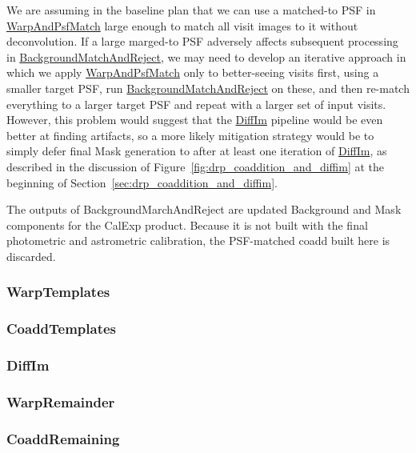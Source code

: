 We are assuming in the baseline plan that we can use a matched-to PSF in \hyperref[sec:drpWarpAndPsfMatch]{WarpAndPsfMatch} large enough to match all visit images to it without deconvolution.  If a large marged-to PSF adversely affects subsequent processing in \hyperref[sec:drpBackgroundMatchAndReject]{BackgroundMatchAndReject}, we may need to develop an iterative approach in which we apply \hyperref[sec:drpWarpAndPsfMatch]{WarpAndPsfMatch} only to better-seeing visits first, using a smaller target PSF, run \hyperref[sec:drpBackgroundMatchAndReject]{BackgroundMatchAndReject} on these, and then re-match everything to a larger target PSF and repeat with a larger set of input visits.  However, this problem would suggest that the \hyperref[sec:DiffIm]{DiffIm} pipeline would be even better at finding artifacts, so a more likely mitigation strategy would be to simply defer final Mask generation to after at least one iteration of \hyperref[sec:DiffIm]{DiffIm}, as described in the discussion of Figure~\ref{fig:drp_coaddition_and_diffim} at the beginning of Section~\ref{sec:drp_coaddition_and_diffim}.

The outputs of BackgroundMarchAndReject are updated Background and Mask components for the CalExp product.  Because it is not built with the final photometric and astrometric calibration, the PSF-matched coadd built here is discarded.

\subsubsection{WarpTemplates}
\label{sec:drpWarpTemplates}

\subsubsection{CoaddTemplates}
\label{sec:drpCoaddTemplates}
\subsubsection{DiffIm}
\label{sec:drpDiffIm}

\subsubsection{WarpRemainder}
\label{sec:drpWarpRemainder}

\subsubsection{CoaddRemaining}
\label{sec:drpCoaddRemaining}

